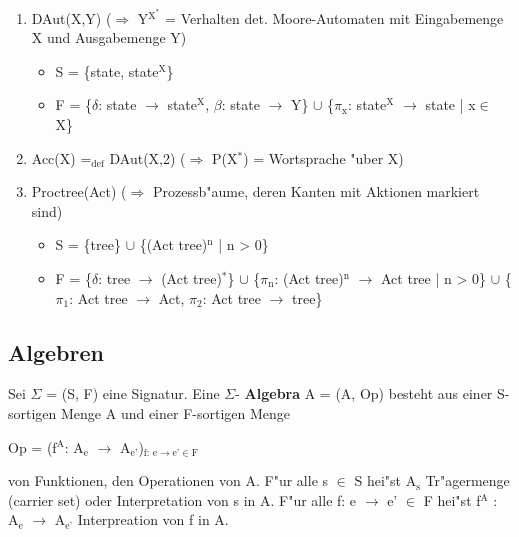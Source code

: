 \documentclass[11pt]{article}
\begin{document}
\begin{enumerate}
\item DAut(X,Y) ($\Rightarrow$ Y$^{\text{X}^{\text{*}}}$ = Verhalten det. Moore-Automaten mit Eingabemenge X und Ausgabemenge Y)
\label{sec-2-5-2-6}
\begin{itemize}
\item S = \{state, state$^{\text{X}}$\}
\item F = \{$\delta$: state $\to$ state$^{\text{X}}$, $\beta$: state $\to$ Y\} $\cup$ \{$\pi$$_{\text{x}}$: state$^{\text{X}}$ $\to$ state | x$\in$ X\}
\end{itemize}

\item Acc(X) =$_{\text{def}}$ DAut(X,2) ($\Rightarrow$ P(X$^{\text{*}}$) = Wortsprache "uber X)
\label{sec-2-5-2-7}

\item Proctree(Act) ($\Rightarrow$ Prozessb"aume, deren Kanten mit Aktionen markiert sind)
\label{sec-2-5-2-8}
\begin{itemize}
\item S = \{tree\} $\cup$ \{(Act \texttimes{} tree)$^{\text{n}}$ | n > 0\}
\item F = \{$\delta$: tree $\to$ (Act \texttimes{} tree)$^{\text{*}}$\} $\cup$ \{$\pi$$_{\text{n}}$: (Act \texttimes{} tree)$^{\text{n}}$ $\to$ Act \texttimes{} tree | n > 0\} $\cup$ \{$\pi$$_{\text{1}}$: Act \texttimes{} tree $\to$ Act, $\pi$$_{\text{2}}$: Act \texttimes{} tree $\to$ tree\}
\end{itemize}
\end{enumerate}

\subsection{Algebren}
\label{sec-2-6}

Sei $\Sigma$ = (S, F) eine Signatur. Eine $\Sigma$- \textbf{Algebra} A = (A, Op) besteht aus einer S-sortigen Menge A und einer F-sortigen Menge
\begin{center}
Op = (f$^{\text{A}}$: A$_{\text{e}}$ $\to$ A$_{\text{e'}}$)$_{\text{f: e} \to \text{e'} \in \text{F}}$
\end{center}
von Funktionen, den Operationen von A.
F"ur alle s $\in$ S hei"st A$_{\text{s}}$ Tr"agermenge (carrier set) oder Interpretation von s in A. F"ur alle f: e $\to$ e' $\in$ F hei"st f$^{\text{A}}$ : A$_{\text{e}}$ $\to$ A$_{\text{e'}}$ Interpreation von f in A.
\end{document}
